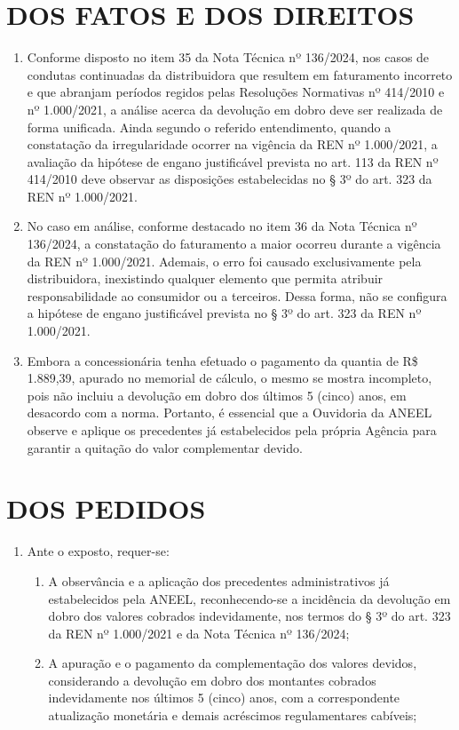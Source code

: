 \newcommand{\tipoRequerimento}{Contestação do memorial de cálculo, pagamento complementar do dobro}

\section{DOS FATOS E DOS DIREITOS}

\begin{enumerate}[resume]
\item Conforme disposto no item 35 da Nota Técnica nº 136/2024, nos casos de condutas continuadas da distribuidora que resultem em faturamento incorreto e que abranjam períodos regidos pelas Resoluções Normativas nº 414/2010 e nº 1.000/2021, a análise acerca da devolução em dobro deve ser realizada de forma unificada. Ainda segundo o referido entendimento, quando a constatação da irregularidade ocorrer na vigência da REN nº 1.000/2021, a avaliação da hipótese de engano justificável prevista no art. 113 da REN nº 414/2010 deve observar as disposições estabelecidas no § 3º do art. 323 da REN nº 1.000/2021.
\item No caso em análise, conforme destacado no item 36 da Nota Técnica nº 136/2024, a constatação do faturamento a maior ocorreu durante a vigência da REN nº 1.000/2021. Ademais, o erro foi causado exclusivamente pela distribuidora, inexistindo qualquer elemento que permita atribuir responsabilidade ao consumidor ou a terceiros. Dessa forma, não se configura a hipótese de engano justificável prevista no § 3º do art. 323 da REN nº 1.000/2021. 
\item Embora a concessionária tenha efetuado o pagamento da quantia de  R\$ 1.889,39, apurado no memorial de cálculo, o mesmo se mostra incompleto, pois não incluiu a devolução em dobro dos últimos 5 (cinco) anos, em desacordo com a norma. Portanto, é essencial que a Ouvidoria da ANEEL observe e aplique os precedentes já estabelecidos pela própria Agência para garantir a quitação do valor complementar devido.
\end{enumerate}

\section{DOS PEDIDOS}

\begin{enumerate}[resume]
\item Ante o exposto, requer-se:
    \begin{enumerate}
    \item A observância e a aplicação dos precedentes administrativos já estabelecidos pela ANEEL, reconhecendo-se a incidência da devolução em dobro dos valores cobrados indevidamente, nos termos do § 3º do art. 323 da REN nº 1.000/2021 e da Nota Técnica nº 136/2024;
    \item A apuração e o pagamento da complementação dos valores devidos, considerando a devolução em dobro dos montantes cobrados indevidamente nos últimos 5 (cinco) anos, com a correspondente atualização monetária e demais acréscimos regulamentares cabíveis;

    \end{enumerate}
\end{enumerate}